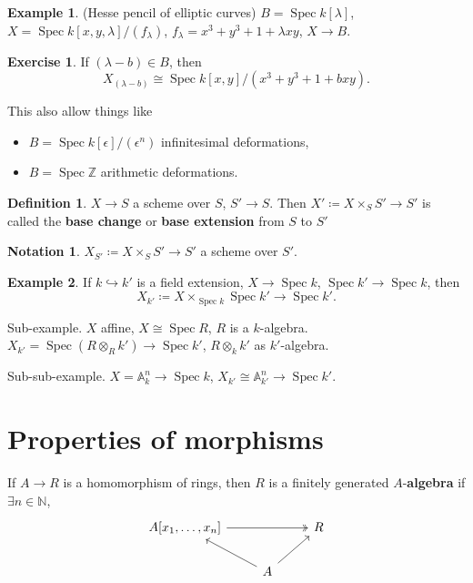\documentclass[12pt]{article}
\DeclareMathOperator{\Spec}{Spec}
\theoremstyle{definition}
\newtheorem*{definition}{Definition}
\newtheorem*{notation}{Notation}
\newtheorem*{exercise}{Exercise}
\newtheorem*{example}{Example}
\begin{document}
\begin{example}
(Hesse pencil of elliptic curves) $B=\Spec k[\lambda]$, $X=\Spec k[x,y,\lambda]/(f_{\lambda})$, $f_{\lambda}=x^3+y^3+1+\lambda xy$, $X\rightarrow B$.

\begin{exercise}
If $(\lambda-b)\in B$, then
\[X_{(\lambda-b)}\cong\Spec k[x,y]/(x^3+y^3+1+bxy).\]
\end{exercise}

This also allow things like
\begin{itemize}
\item $B=\Spec k[\epsilon]/(\epsilon^n)$ infinitesimal deformations,
\item $B=\Spec\mathbb{Z}$ arithmetic deformations.
\end{itemize}
\end{example}

\begin{definition}
$X\rightarrow S$ a scheme over $S$, $S'\rightarrow S$. Then $X'\coloneqq X\times_SS'\rightarrow S'$ is called the \textbf{base change} or \textbf{base extension} from $S$ to $S'$
\end{definition}

\begin{notation}
$X_{S'}\coloneqq X\times_SS'\rightarrow S'$ a scheme over $S'$.
\end{notation}

\begin{example}
If $k\hookrightarrow k'$ is a field extension, $X\rightarrow\Spec k$, $\Spec k'\rightarrow\Spec k$, then
\[X_{k'}\coloneqq X\times_{\Spec k}\Spec k'\longrightarrow\Spec k'.\]

Sub-example. $X$ affine, $X\cong\Spec R$, $R$ is a $k$-algebra. $X_{k'}=\Spec(R\otimes_Rk')\rightarrow\Spec k'$, $R\otimes_kk'$ as $k'$-algebra.

Sub-sub-example. $X=\mathbb{A}_k^n\rightarrow\Spec k$, $X_{k'}\cong\mathbb{A}_{k'}^n\rightarrow\Spec k'$.
\end{example}

\section{Properties of morphisms}
If $A\rightarrow R$ is a homomorphism of rings, then $R$ is a finitely generated $A$-\textbf{algebra} if $\exists n\in\mathbb{N}$,
\[
\begin{tikzcd}
A[x_1,\ldots,x_n]\arrow[rr,two heads]&&R\\
&A\arrow[lu]\arrow[ru]
\end{tikzcd}
\]
\end{document}
